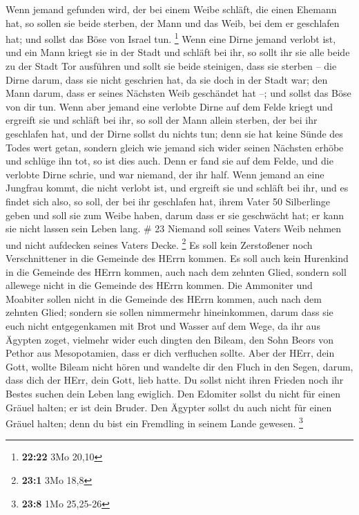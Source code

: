  Wenn jemand gefunden wird, der bei einem Weibe schläft,
die einen Ehemann hat, so sollen sie beide sterben, der Mann und das
Weib, bei dem er geschlafen hat; und sollst das Böse von Israel tun.
\footnote{\textbf{22:22} 3Mo 20,10}  Wenn eine Dirne jemand
verlobt ist, und ein Mann kriegt sie in der Stadt und schläft bei ihr,
 so sollt ihr sie alle beide zu der Stadt Tor ausführen und
sollt sie beide steinigen, dass sie sterben -- die Dirne darum, dass sie
nicht geschrien hat, da sie doch in der Stadt war; den Mann darum, dass
er seines Nächsten Weib geschändet hat --; und sollst das Böse von dir
tun.  Wenn aber jemand eine verlobte Dirne auf dem Felde
kriegt und ergreift sie und schläft bei ihr, so soll der Mann allein
sterben, der bei ihr geschlafen hat,  und der Dirne sollst
du nichts tun; denn sie hat keine Sünde des Todes wert getan, sondern
gleich wie jemand sich wider seinen Nächsten erhöbe und schlüge ihn tot,
so ist dies auch.  Denn er fand sie auf dem Felde, und die
verlobte Dirne schrie, und war niemand, der ihr half.  Wenn
jemand an eine Jungfrau kommt, die nicht verlobt ist, und ergreift sie
und schläft bei ihr, und es findet sich also,  so soll, der
bei ihr geschlafen hat, ihrem Vater 50 Silberlinge geben und soll sie
zum Weibe haben, darum dass er sie geschwächt hat; er kann sie nicht
lassen sein Leben lang. \# 23  Niemand soll seines Vaters
Weib nehmen und nicht aufdecken seines Vaters Decke. \footnote{\textbf{23:1}
  3Mo 18,8}  Es soll kein Zerstoßener noch Verschnittener in
die Gemeinde des HErrn kommen.  Es soll auch kein Hurenkind
in die Gemeinde des HErrn kommen, auch nach dem zehnten Glied, sondern
soll allewege nicht in die Gemeinde des HErrn kommen.  Die
Ammoniter und Moabiter sollen nicht in die Gemeinde des HErrn kommen,
auch nach dem zehnten Glied; sondern sie sollen nimmermehr hineinkommen,
 darum dass sie euch nicht entgegenkamen mit Brot und Wasser
auf dem Wege, da ihr aus Ägypten zoget, vielmehr wider euch dingten den
Bileam, den Sohn Beors von Pethor aus Mesopotamien, dass er dich
verfluchen sollte.  Aber der HErr, dein Gott, wollte Bileam
nicht hören und wandelte dir den Fluch in den Segen, darum, dass dich
der HErr, dein Gott, lieb hatte.  Du sollst nicht ihren
Frieden noch ihr Bestes suchen dein Leben lang ewiglich. 
Den Edomiter sollst du nicht für einen Gräuel halten; er ist dein
Bruder. Den Ägypter sollst du auch nicht für einen Gräuel halten; denn
du bist ein Fremdling in seinem Lande gewesen. \footnote{\textbf{23:8}
  1Mo 25,25-26}

